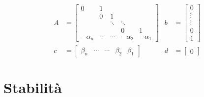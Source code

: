 \begin{equation*}
	\begin{aligned}
		A & =\begin{bmatrix}
		0          & 1      &        &            &            \\
		           & 0      & 1      &            &            \\
		           &        & \ddots & \ddots     &            \\
		           &        &        & 0          & 1          \\
		-\alpha _n & \cdots & \cdots & -\alpha _2 & -\alpha _1 
		\end{bmatrix} & b & =\begin{bmatrix}
		0\\
		\vdots \\
		\vdots \\
		0\\
		1
		\end{bmatrix}\\
		c & =\begin{bmatrix}
		\beta _n   & \cdots & \cdots & \beta _2   & \beta _1   
		\end{bmatrix} & d & =\begin{bmatrix}
		0
		\end{bmatrix}
	\end{aligned}
\end{equation*}

\chapter{Stabilità}

